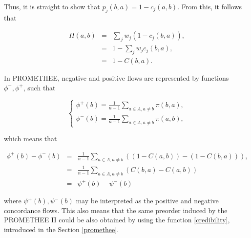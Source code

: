 \documentclass[]{elsarticle}
\theoremstyle{definition}
\begin{document}
\noindent
Thus, it is straight to show that $p_j(b,a)=1-c_j(a,b)$.  From this, it follows that 

\begin{eqnarray}
\Pi(a,b)	&=&\sum_{j}w_j(1-c_j(b,a)), \\
		&=&1- \sum_{j}w_jc_j(b,a), \\
		&=&1-C(b,a).
\end{eqnarray}

\noindent
In PROMETHEE, negative and positive flows are represented by functions $\phi^-,\phi^+$, such that 

\begin{equation}
\begin{cases}
\phi^+(b)=\frac{1}{n-1} \sum_{a \in A, a \neq b} \pi(b,a) , \\
\phi^-(b)= \frac{1}{n-1}\sum_{a \in A, a \neq b} \pi(a,b),
\end{cases}
\end{equation}

\noindent
which means that

\begin{eqnarray}
\phi^+(b)-\phi^-(b) 	&=& \frac{1}{n-1} \sum_{a \in A, a \neq b} \left((1-C(a,b))-(1-C(b,a))\right) , \\
				&=& \frac{1}{n-1} \sum_{a \in A, a \neq b} \left(C(b,a)-C(a,b)\right) \\
				&=& \psi^+(b)-\psi^-(b)
\end{eqnarray}

\noindent
where $\psi^+(b), \psi^-(b)$ may be interpreted as the positive and negative concordance flows.  This also means that the same preorder induced by the PROMETHEE II could be also obtained   by using the  function \eqref{credibility}, introduced in the Section \ref{promethee}.
\end{document}
